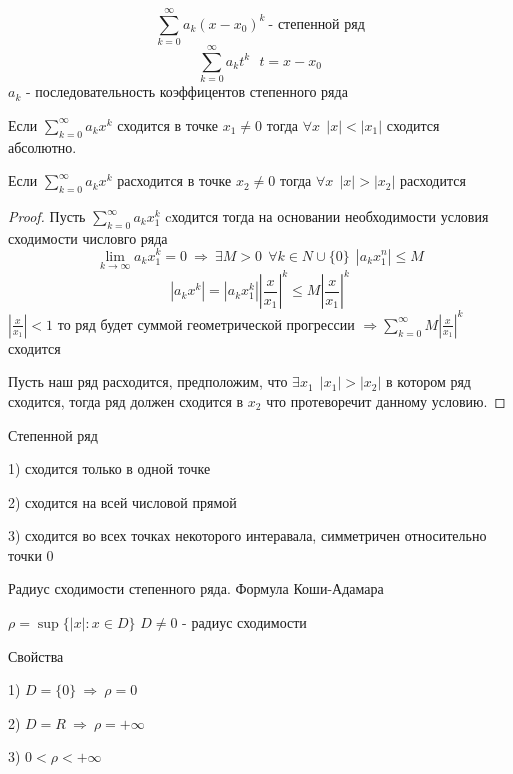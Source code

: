 \begin{define}
  $$
  \sum_{k=0}^{\infty} a_k (x-x_0)^k ~ \text{- степенной ряд}
  $$
  $$
  \sum_{k=0}^{\infty} a_k t^k ~~~ t = x - x_0
  $$
  $a_k$ - последовательность коэффицентов степенного ряда
\end{define}

\begin{theorem}[Абеля]
  Если $\sum_{k=0}^{\infty} a_k x^k$ сходится в точке $x_1 \not= 0$ тогда
  $\forall x ~~ |x| < |x_1|$ сходится абсолютно.

  Если $\sum_{k=0}^{\infty} a_k x^k$ расходится в точке $x_2 \not= 0$ тогда
  $\forall x ~~ |x| > |x_2|$ расходится
\end{theorem}

\begin{proof}
  Пусть $\sum_{k = 0}^{\infty}a_k x_1^k$ cходится тогда на основании
  необходимости условия сходимости числовго ряда
  $$
  \lim_{k \to \infty} a_k x_1^k = 0 ~ \Rightarrow ~ \exists M > 0 ~~
  \forall k \in N \cup \{0\} ~~ |a_k x_1^n| \le M
  $$
  $$
  |a_k x^k| = |a_k x_1^k| \left| \frac{x}{x_1} \right|^k \le
  M \left| \frac{x}{x_1} \right|^k
  $$
  $\left| \frac{x}{x_1} \right| < 1$ то ряд будет суммой геометрической
  прогрессии $\Rightarrow \sum_{k=0}^{\infty} M \left| \frac{x}{x_1} \right|^k$
  сходится

  Пусть наш ряд расходится, предположим, что $\exists x_1 ~~ |x_1| > |x_2|$ в
  котором ряд сходится, тогда ряд должен сходится в $x_2$ что протеворечит
  данному условию.
\end{proof}

\begin{block}
  Степенной ряд

  1) сходится только в одной точке

  2) сходится на всей числовой прямой

  3) сходится во всех точках некоторого интеравала, симметричен относительно
  точки $0$
\end{block}

\begin{title}[\Large]
  Радиус сходимости степенного ряда. Формула Коши-Адамара
\end{title}

\begin{define}
  $\rho = \sup\{ |x| : x \in D \}$ $D \not= 0$ - радиус сходимости

  Свойства

  1) $D = \{0\} ~ \Rightarrow ~ \rho = 0$

  2) $D = R ~ \Rightarrow ~ \rho = +\infty$

  3) $0 < \rho < +\infty$
\end{define}

